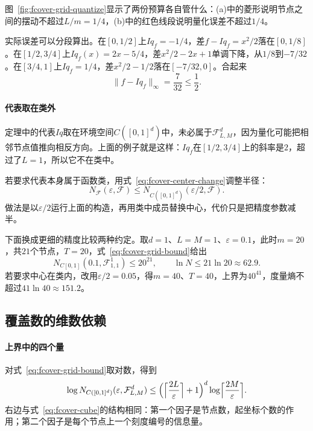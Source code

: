 图~\ref{fig:fcover-grid-quantize}显示了两份预算各自管什么：(a)中的菱形说明节点之间的摆动不超过$L/m=1/4$，(b)中的红色线段说明量化误差不超过$1/4$。

实际误差可以分段算出。在$[0,1/2]$上$Iq_f=-1/4$，差$f-Iq_f=x^2/2$落在$[0,1/8]$。在$[1/2,3/4]$上$Iq_f(x)=2x-5/4$，差$x^2/2-2x+1$单调下降，从$1/8$到$-7/32$。在$[3/4,1]$上$Iq_f=1/4$，差$x^2/2-1/2$落在$[-7/32,0]$。合起来
\[
 \lVert f-Iq_f\rVert_\infty=\frac7{32}\leq\frac12 .
\]

\paragraph{代表取在类外}

定理中的代表$Iq$取在环境空间$C([0,1]^d)$中，未必属于$\mathcal F^d_{L,M}$，因为量化可能把相邻节点值推向相反方向。上面的例子就是这样：$Iq_f$在$[1/2,3/4]$上的斜率是$2$，超过了$L=1$，所以它不在类中。

若要求代表本身属于函数类，用式~\eqref{eq:fcover-center-change}调整半径：
\[
 N_{\mathcal F}(\varepsilon,\mathcal F)\leq N_{C([0,1]^d)}(\varepsilon/2,\mathcal F).
\]
做法是以$\varepsilon/2$运行上面的构造，再用类中成员替换中心，代价只是把精度参数减半。

下面换成更细的精度比较两种约定。取$d=1$、$L=M=1$、$\varepsilon=0.1$，此时$m=20$，共$21$个节点，$T=20$，式~\eqref{eq:fcover-grid-bound}给出
\[
 N_{C[0,1]}(0.1,\mathcal F^1_{1,1})\leq20^{21},\qquad \ln N\leq21\ln20\approx62.9 .
\]
若要求中心在类内，改用$\varepsilon/2=0.05$，得$m=40$、$T=40$，上界为$40^{41}$，度量熵不超过$41\ln40\approx151.2$。

\subsection{覆盖数的维数依赖}
\label{sec:fcover-dimension-dependence}

\paragraph{上界中的四个量}

对式~\eqref{eq:fcover-grid-bound}取对数，得到
\begin{equation}
 \log N_{C([0,1]^d)}(\varepsilon,\mathcal F^d_{L,M})\leq
 \Bigl(\Bigl\lceil\frac{2L}\varepsilon\Bigr\rceil+1\Bigr)^d
 \log\Bigl\lceil\frac{2M}\varepsilon\Bigr\rceil .
 \label{eq:fcover-entropy-bound}
\end{equation}
右边与式~\eqref{eq:fcover-cube}的结构相同：第一个因子是节点数，起坐标个数的作用；第二个因子是每个节点上一个刻度编号的信息量。

